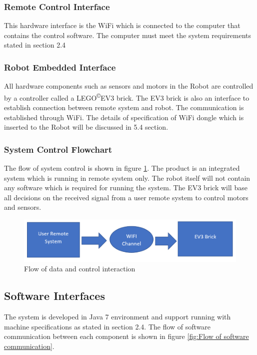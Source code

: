 \documentclass[10pt,a4paper,titlepage]{article}
\newcommand{\cpright}{\textsuperscript{\tiny\copyright}}
\begin{document}
	\subsubsection*{Remote Control Interface}
	This hardware interface is the WiFi which is connected to the computer that contains the control software. The computer must meet the system requirements stated in section 2.4
	
	\subsubsection*{Robot Embedded Interface}
	All hardware components such as sensors and motors in the Robot are controlled by a controller called a LEGO\cpright EV3 brick. The EV3 brick is also an interface to establish connection between remote system and robot. The communication is established through WiFi. The details of specification of WiFi dongle which is inserted to the Robot will be discussed in 5.4 section.
	
	\subsubsection*{System Control Flowchart}
	The flow of system control is shown in figure \ref{fig:Flow of data and control interaction}. The product is an integrated system which is running in remote system only. The robot itself will not contain any software which is required for running the system. The EV3 brick will base all decisions on the received signal from a user remote system to control motors and sensors.
	
	\begin{figure}[h]
		\includegraphics[width=\linewidth]{data_and_control.PNG}
		\caption{Flow of data and control interaction}
		\label{fig:Flow of data and control interaction}
	\end{figure}
	
	\subsection{Software Interfaces}  
	The system is developed in Java 7 environment and support running with machine specifications as stated in section 2.4. The flow of software communication between each component is shown in figure \ref{fig:Flow of software communication}.
	
\end{document}
